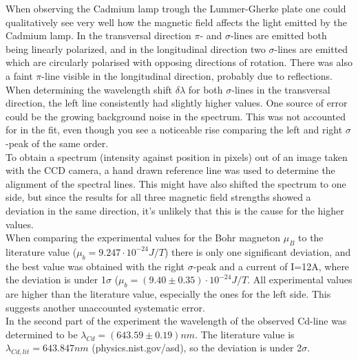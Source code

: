 \documentclass[12pt]{article}
\begin{document}
When observing the Cadmium lamp trough the Lummer-Gherke plate one could qualitatively see very well how the magnetic field affects the light emitted by the Cadmium lamp. In the transversal direction $\pi$- and $\sigma$-lines are emitted both being linearly polarized, and in the longitudinal direction two $\sigma$-lines are emitted which are circularly polarised with opposing directions of rotation. There was also a faint $\pi$-line visible in the longitudinal direction, probably due to reflections.
\\When determining the wavelength shift $\delta \lambda$ for both $\sigma$-lines in the transversal direction, the left line consistently had slightly higher values. One source of error could be the growing background noise in the spectrum. This was not accounted for in the fit, even though you see a noticeable rise comparing the left and right $\sigma$-peak of the same order. 
\\To obtain a spectrum (intensity against position in pixels) out of an image taken with the CCD camera, a hand drawn reference line was used to determine the alignment of the spectral lines. This might have also shifted the spectrum to one side, but since the results for all three magnetic field strengths showed a deviation in the same direction, it's unlikely that this is the cause for the higher values. 
\\When comparing the experimental values for the Bohr magneton $\mu_B$ to the literature value ($\mu_b=9.247\cdot10^{-24}J/T$) there is only one significant deviation, and the best value was obtained with the right $\sigma$-peak and a current of I=12A, where the deviation is under 1$\sigma$ ($\mu_b=(9.40\pm0.35)\cdot10^{-24}J/T$. All experimental values are higher than the literature value, especially the ones for the left side. This suggests another unaccounted systematic error.
\\In the second part of the experiment the wavelength of the observed Cd-line was determined to be $\lambda_{Cd}=(643.59\pm0.19)nm$. The literature value is $\lambda_{Cd, lit}=643.847nm$ (physics.nist.gov/asd), so the deviation is under 2$\sigma$. 
\end{document}
